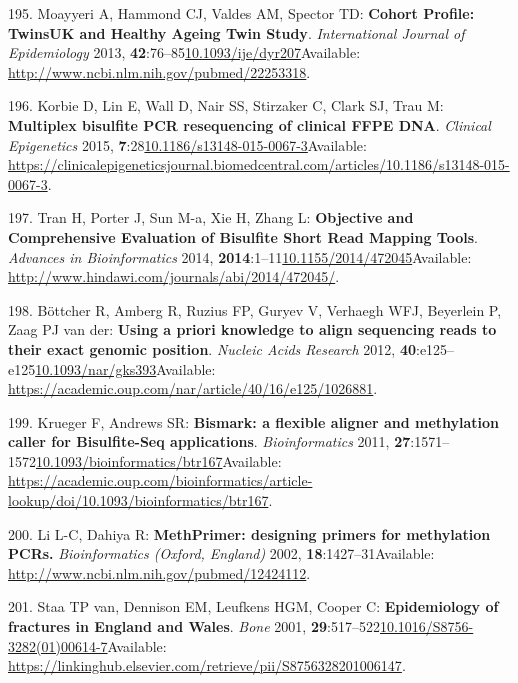 \documentclass[
]{book}
\begin{document}
\leavevmode\hypertarget{ref-Moayyeri2013}{}%
195. Moayyeri A, Hammond CJ, Valdes AM, Spector TD: \textbf{Cohort Profile: TwinsUK and Healthy Ageing Twin Study}. \emph{International Journal of Epidemiology} 2013, \textbf{42}:76--85\href{https://doi.org/10.1093/ije/dyr207}{10.1093/ije/dyr207}Available: \url{http://www.ncbi.nlm.nih.gov/pubmed/22253318}.

\leavevmode\hypertarget{ref-Korbie2015}{}%
196. Korbie D, Lin E, Wall D, Nair SS, Stirzaker C, Clark SJ, Trau M: \textbf{Multiplex bisulfite PCR resequencing of clinical FFPE DNA}. \emph{Clinical Epigenetics} 2015, \textbf{7}:28\href{https://doi.org/10.1186/s13148-015-0067-3}{10.1186/s13148-015-0067-3}Available: \url{https://clinicalepigeneticsjournal.biomedcentral.com/articles/10.1186/s13148-015-0067-3}.

\leavevmode\hypertarget{ref-Tran2014}{}%
197. Tran H, Porter J, Sun M-a, Xie H, Zhang L: \textbf{Objective and Comprehensive Evaluation of Bisulfite Short Read Mapping Tools}. \emph{Advances in Bioinformatics} 2014, \textbf{2014}:1--11\href{https://doi.org/10.1155/2014/472045}{10.1155/2014/472045}Available: \url{http://www.hindawi.com/journals/abi/2014/472045/}.

\leavevmode\hypertarget{ref-Bottcher2012}{}%
198. Böttcher R, Amberg R, Ruzius FP, Guryev V, Verhaegh WFJ, Beyerlein P, Zaag PJ van der: \textbf{Using a priori knowledge to align sequencing reads to their exact genomic position}. \emph{Nucleic Acids Research} 2012, \textbf{40}:e125--e125\href{https://doi.org/10.1093/nar/gks393}{10.1093/nar/gks393}Available: \url{https://academic.oup.com/nar/article/40/16/e125/1026881}.

\leavevmode\hypertarget{ref-Krueger2011}{}%
199. Krueger F, Andrews SR: \textbf{Bismark: a flexible aligner and methylation caller for Bisulfite-Seq applications}. \emph{Bioinformatics} 2011, \textbf{27}:1571--1572\href{https://doi.org/10.1093/bioinformatics/btr167}{10.1093/bioinformatics/btr167}Available: \url{https://academic.oup.com/bioinformatics/article-lookup/doi/10.1093/bioinformatics/btr167}.

\leavevmode\hypertarget{ref-Li2002}{}%
200. Li L-C, Dahiya R: \textbf{MethPrimer: designing primers for methylation PCRs.} \emph{Bioinformatics (Oxford, England)} 2002, \textbf{18}:1427--31Available: \url{http://www.ncbi.nlm.nih.gov/pubmed/12424112}.

\leavevmode\hypertarget{ref-VanStaa2001}{}%
201. Staa TP van, Dennison EM, Leufkens HGM, Cooper C: \textbf{Epidemiology of fractures in England and Wales}. \emph{Bone} 2001, \textbf{29}:517--522\href{https://doi.org/10.1016/S8756-3282(01)00614-7}{10.1016/S8756-3282(01)00614-7}Available: \url{https://linkinghub.elsevier.com/retrieve/pii/S8756328201006147}.
\end{document}
